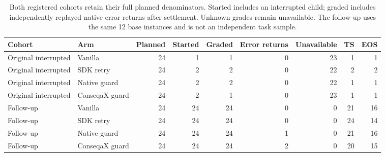 \begin{table}[t]
\caption{Both registered cohorts retain their full planned denominators. Started includes an interrupted child; graded includes independently replayed native error returns after settlement. Unknown grades remain unavailable. The follow-up uses the same 12 base instances and is not an independent task sample.}
\label{tab:limbo-cohorts}\centering\small\setlength{\tabcolsep}{4pt}
\begin{tabular}{llrrrrrrr}\toprule
Cohort & Arm & Planned & Started & Graded & Error returns & Unavailable & TS & EOS \\
\midrule
Original interrupted & Vanilla & 24 & 1 & 1 & 0 & 23 & 1 & 1 \\
Original interrupted & SDK retry & 24 & 2 & 2 & 0 & 22 & 2 & 2 \\
Original interrupted & Native guard & 24 & 2 & 2 & 0 & 22 & 1 & 1 \\
Original interrupted & ConseqaX guard & 24 & 2 & 1 & 0 & 23 & 1 & 1 \\
Follow-up & Vanilla & 24 & 24 & 24 & 0 & 0 & 21 & 16 \\
Follow-up & SDK retry & 24 & 24 & 24 & 0 & 0 & 24 & 14 \\
Follow-up & Native guard & 24 & 24 & 24 & 1 & 0 & 21 & 16 \\
Follow-up & ConseqaX guard & 24 & 24 & 24 & 2 & 0 & 20 & 15 \\
\bottomrule\end{tabular}\end{table}
